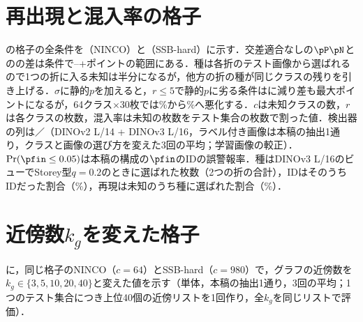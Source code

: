 \section{再出現と混入率の格子}
\label{sec:app_rec}
の格子の全条件を（NINCO）と（SSB-hard）に示す．交差適合なしの$\pP\pN$との\FPR{}の差は\NRecNAll{}条件で\NRecMinMainMinusVOne{}--+\NRecMaxMainMinusVOne{}ポイントの範囲にある．種は各折のテスト画像から選ばれるので1つの折に入る未知は半分になるが，他方の折の種が同じクラスの残りを引き上げる．$\sigma$に静的$p$を加えると，$r\le5$で静的$p$に劣る条件は\NRecNRLeFivePpsWorseStatic{}に減り差も最大\NRecMaxPpsMinusStaticLeFive{}ポイントになるが，64クラス$\times$30枚では\NRecNincoCSixFourRThreeZeroMainFpr\%から\NRecNincoCSixFourRThreeZeroPpsFpr\%へ悪化する．$c$は未知クラスの数，$r$は各クラスの枚数，混入率は未知の枚数をテスト集合の枚数で割った値．検出器の列は\AUC{}／\FPR{}（DINOv2 L/14 + DINOv3 L/16，ラベル付き画像は本稿の抽出1通り，クラスと画像の選び方を変えた3回の平均；学習画像の較正）．$\Pr(\pfin\le0.05)$は本稿の構成の$\pfin$のIDの誤警報率．種はDINOv3 L/16のビューでStorey型$q{=}0.2$のときに選ばれた枚数（2つの折の合計），IDはそのうちIDだった割合（\%），再現は未知のうち種に選ばれた割合（\%）．

\begin{table}[t]
\centering
\caption{再出現と混入率の格子：NINCO（[\%]）．}
\label{tab:recninco}
\vspace{1.5mm}

\end{table}

\begin{table}[t]
\centering
\caption{再出現と混入率の格子：SSB-hard（[\%]）．}
\label{tab:recssb}
\vspace{1.5mm}

\end{table}

\section{近傍数$k_g$を変えた格子}
\label{sec:app_kg}
に，同じ格子のNINCO（$c{=}64$）とSSB-hard（$c{=}980$）で，グラフの近傍数を$k_g\in\{3,5,10,20,40\}$と変えた値を示す（単体，本稿の抽出1通り，3回の平均；1つのテスト集合につき上位40個の近傍リストを1回作り，全$k_g$を同じリストで評価）．

